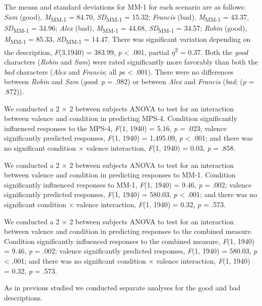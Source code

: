 \documentclass[
  man,floatsintext]{apa6}
\begin{document}
The means and standard deviations for MM-1 for each scenario are as follows:
\emph{Sam} (good),
\emph{M}\textsubscript{MM-1} = 84.70, \emph{SD}\textsubscript{MM-1} = 15.32;
\emph{Francis} (bad),
\emph{M}\textsubscript{MM-1} = 43.37, \emph{SD}\textsubscript{MM-1} = 34.96;
\emph{Alex} (bad),
\emph{M}\textsubscript{MM-1} = 44.68, \emph{SD}\textsubscript{MM-1} = 34.57;
\emph{Robin} (good),
\emph{M}\textsubscript{MM-1} = 85.33, \emph{SD}\textsubscript{MM-1} = 14.47. There was significant variation depending on the description, \emph{F}(3,1940) = 383.99, \emph{p} \textless{} .001, partial \(\eta\)\textsuperscript{2} = 0.37. Both the \emph{good} characters (\emph{Robin} and \emph{Sam}) were rated significantly more favorably than both the \emph{bad} characters (\emph{Alex} and \emph{Francis}; all \emph{p}s \textless{} .001). There were no differences between \emph{Robin} and \emph{Sam} (\emph{good}: \emph{p} = .982) or between \emph{Alex} and \emph{Francis} (\emph{bad}; (\emph{p} = .872)).

We conducted a 2 \(\times\) 2 between subjects ANOVA to test for an interaction between valence and condition in predicting MPS-4.
Condition significantly influenced responses to the MPS-4,
\emph{F}(1, 1940) = 5.16, \emph{p} = .023;
valence significantly predicted responses,
\emph{F}(1, 1940) = 1,495.09, \emph{p} \textless{} .001;
and there was no significant condition \(\times\) valence interaction,
\emph{F}(1, 1940) = 0.03, \emph{p} = .858.

We conducted a 2 \(\times\) 2 between subjects ANOVA to test for an interaction between valence and condition in predicting responses to MM-1.
Condition significantly influenced responses to MM-1,
\emph{F}(1, 1940) = 9.46, \emph{p} = .002;
valence significantly predicted responses,
\emph{F}(1, 1940) = 580.03, \emph{p} \textless{} .001;
and there was no significant condition \(\times\) valence interaction,
\emph{F}(1, 1940) = 0.32, \emph{p} = .573.

We conducted a 2 \(\times\) 2 between subjects ANOVA to test for an interaction between valence and condition in predicting responses to the combined measure.
Condition significantly influenced responses to the combined measure,
\emph{F}(1, 1940) = 9.46, \emph{p} = .002;
valence significantly predicted responses,
\emph{F}(1, 1940) = 580.03, \emph{p} \textless{} .001;
and there was no significant condition \(\times\) valence interaction,
\emph{F}(1, 1940) = 0.32, \emph{p} = .573.

As in previous studied we conducted separate analyses for the good and bad descriptions.
\end{document}
